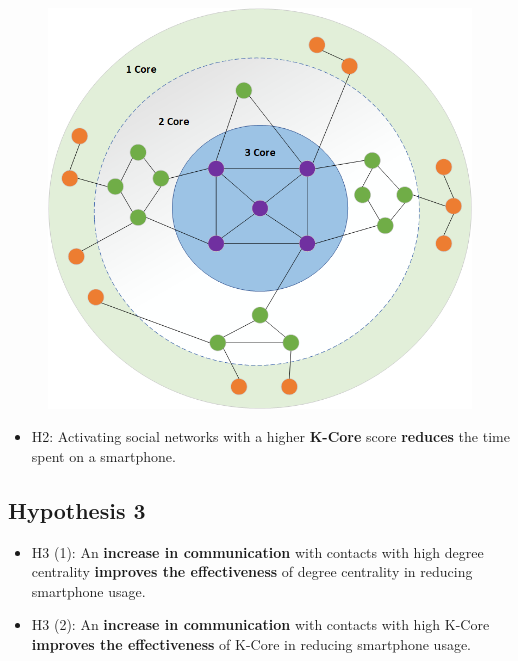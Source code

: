 \documentclass[
  letterpaper,
  DIV=11,
  numbers=noendperiod]{scrartcl}
\providecommand{\tightlist}{%
  \setlength{\itemsep}{0pt}\setlength{\parskip}{0pt}}\usepackage{longtable,booktabs,array}
\begin{document}
\begin{figure}

{\centering \includegraphics{images/core_number.png}

}

\end{figure}

\begin{itemize}
\tightlist
\item
  H2: Activating social networks with a higher \textbf{K-Core} score
  \textbf{reduces} the time spent on a smartphone.
\end{itemize}

\hypertarget{hypothesis-3}{%
\subsection{Hypothesis 3}\label{hypothesis-3}}

\begin{itemize}
\tightlist
\item
  H3 (1): An \textbf{increase in communication} with contacts with high
  degree centrality \textbf{improves the effectiveness} of degree
  centrality in reducing smartphone usage.
\item
  H3 (2): An \textbf{increase in communication} with contacts with high
  K-Core \textbf{improves the effectiveness} of K-Core in reducing
  smartphone usage.
\end{itemize}
\end{document}
